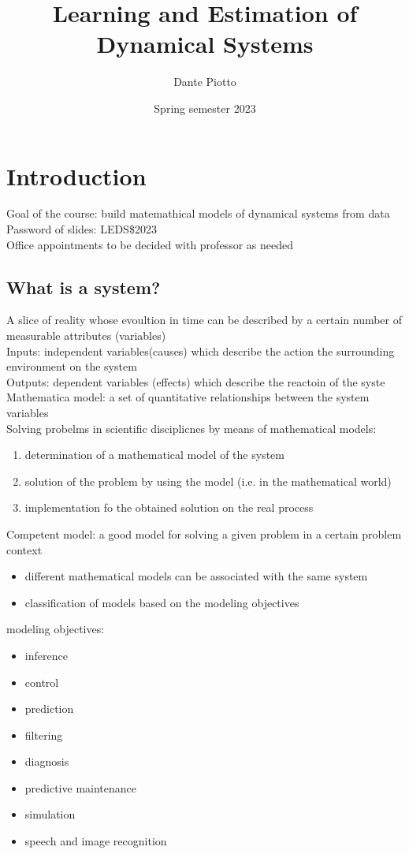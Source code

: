 \documentclass{book}
\title{Learning and Estimation of Dynamical Systems}
\author{Dante Piotto}
\date{Spring semester 2023}
\theoremstyle{definition}
\theoremstyle{remark}
\theoremstyle{remark}
\begin{document}
\maketitle

\tableofcontents

\chapter{Introduction}
Goal of the course: build matemathical models of dynamical systems from data\\
Password of slides: LEDS\$2023\\
Office appointments to be decided with professor as needed\\
\section{What is a system?}
A slice of reality whose evoultion in time can be described by a certain number of measurable attributes (variables)\\
Inputs: independent variables(causes) which describe the action the surrounding environment on the system\\
Outputs: dependent variables (effects) which describe the reactoin of the syste\\
Mathematica model: a set of quantitative relationships between the system variables\\
Solving probelms in scientific disciplicnes by means of mathematical models:
\begin{enumerate}
    \item determination of a mathematical model of the system
    \item solution of the problem by using the model (i.e. in the mathematical world)
    \item implementation fo the obtained solution on the real process
\end{enumerate}
Competent model: a good model for solving a given problem in a certain problem context
\begin{itemize}
    \item different mathematical models can be associated with the same system
    \item classification of models based on  the modeling objectives
\end{itemize}
modeling objectives:
\begin{itemize}
    \item inference
    \item control
    \item prediction
    \item filtering
    \item diagnosis
    \item predictive maintenance
    \item simulation
    \item speech and image recognition
\end{itemize}
\end{document}
